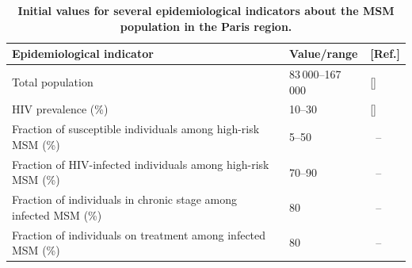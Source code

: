 \documentclass[12pt]{article}
\begin{document}
\begin{table}[H]
	\small
	\centering
	\caption[Initial values for several epidemiological indicators about the MSM population in the Paris region]{%
	    \textbf{Initial values for several epidemiological indicators about the MSM population in the Paris region.}}
	\begin{tabular}{lll}
	\toprule
	\bf Epidemiological indicator 	& \bf Value/range 	& \bf [Ref.]\\
	\midrule
	Total population										& 83\,000--167\,000 	& [\citenum{Bajos2018,Insee2015}]\\
	HIV prevalence	 (\%)									& 10--30			& [\citenum{Prevagay2017}]\\
	Fraction of susceptible individuals {among high-risk MSM}	(\%) 	& 5--50			& \, --\\
	Fraction of {HIV-}infected individuals {among high-risk MSM} (\%)	& 70--90			& \, --\\
	Fraction of {individuals in chronic stage among infected MSM} (\%)	& 80 				& \, --\\
	Fraction of {individuals on treatment among infected MSM} (\%)			& 80				& \, --\\
	\bottomrule
	\end{tabular}
	\label{tab:InitConds}
\end{table}

\vfill
\phantom{.}
\newpage
\end{document}
